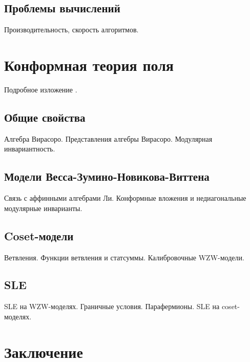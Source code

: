 \documentclass[12pt]{disser}
\theoremstyle{definition}
\begin{document}
\section{Проблемы вычислений}
\label{sec:computations}
Производительность, скорость алгоритмов. 

\chapter{Конформная теория поля}
\label{cha:cft}

Подробное изложение \cite{difrancesco1997cft}. 

\section{Общие свойства}
\label{sec:cft-general}
Алгебра Вирасоро. Представления алгебры Вирасоро. Модулярная инвариантность.

\section{Модели Весса-Зумино-Новикова-Виттена}
\label{sec:wzw}
Связь с аффинными алгебрами Ли.
Конформные вложения и недиагональные модулярные инварианты. 

\section{Coset-модели}
\label{sec:coset-models}
Ветвления. Функции ветвления и статсуммы. 
Калибровочные WZW-модели. 

\section{SLE}
\label{sec:sle}
SLE на WZW-моделях. Граничные условия. Парафермионы. SLE на coset-моделях.

\chapter{Заключение}
\label{cha:conclusion}


{}

\end{document}
